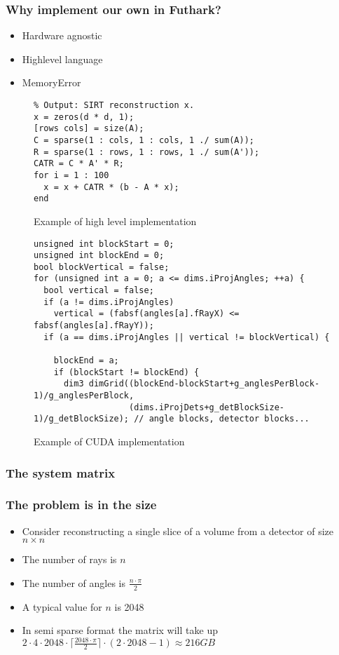 \documentclass{beamer}
\newcommand{\inputTikZ}[2]{%
     \scalebox{#1}{}
}
\begin{document}
\begin{frame}
\frametitle{Why implement our own in Futhark?}
\begin{itemize}
\item{Hardware agnostic}
\item{Highlevel language}
\item{MemoryError}
\end{itemize}
\end{frame}

\begin{frame}[fragile]
\begin{figure}[!h]
\begin{lstlisting}[frame=single]
% Input: sparse system matrix A, data b.
% Output: SIRT reconstruction x.
x = zeros(d * d, 1);
[rows cols] = size(A);
C = sparse(1 : cols, 1 : cols, 1 ./ sum(A));
R = sparse(1 : rows, 1 : rows, 1 ./ sum(A'));
CATR = C * A' * R;
for i = 1 : 100
  x = x + CATR * (b - A * x);
end
\end{lstlisting}
  \caption{Example of high level implementation}
\end{figure}
\end{frame}

\begin{frame}[fragile]
\begin{figure}[!h]
\begin{lstlisting}[frame=single]
unsigned int blockStart = 0;
unsigned int blockEnd = 0;
bool blockVertical = false;
for (unsigned int a = 0; a <= dims.iProjAngles; ++a) {
  bool vertical = false;
  if (a != dims.iProjAngles)
    vertical = (fabsf(angles[a].fRayX) <= fabsf(angles[a].fRayY));
  if (a == dims.iProjAngles || vertical != blockVertical) {

    blockEnd = a;
    if (blockStart != blockEnd) {
      dim3 dimGrid((blockEnd-blockStart+g_anglesPerBlock-1)/g_anglesPerBlock,
                   (dims.iProjDets+g_detBlockSize-1)/g_detBlockSize); // angle blocks, detector blocks...
\end{lstlisting}
  \caption{Example of CUDA implementation}
\end{figure}
\end{frame}

\begin{frame}
\frametitle{The system matrix}
\inputTikZ{0.6}{figures/weightings.tex}
\end{frame}

\begin{frame}
\frametitle{The problem is in the size}
\begin{itemize}
\item{Consider reconstructing a single slice of a volume from a detector of size $n\times n$}
\item{The number of rays is $n$}
\item{The number of angles is $\frac{n\cdot\pi}{2}$}
\item{A typical value for $n$ is 2048 }
\item{In semi sparse format the matrix will take up $2\cdot4\cdot2048\cdot\lceil\frac{2048\cdot\pi}{2}\rceil\cdot (2\cdot2048-1)\approx 216GB$}
\end{itemize}
\end{frame}
\end{document}

